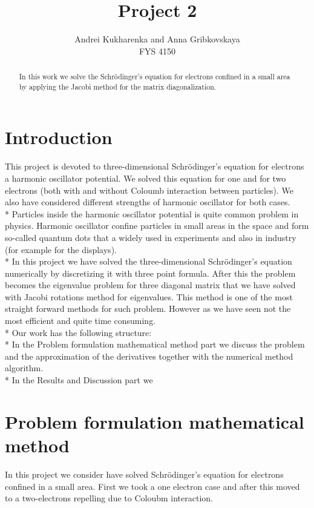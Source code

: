 \documentclass[10pt]{article}
\begin{document}
\setlength\parindent{1pt}
\title{Project 2}
\author{Andrei Kukharenka and Anna Gribkovskaya \\  
FYS 4150 
}

\maketitle
\begin{abstract}
In this work we solve the Schr\"{o}dinger's equation for electrons confined in a small area by applying the Jacobi method for the matrix diagonalization. 
\end{abstract}
\clearpage 


\section{Introduction}
This project is devoted to three-dimensional Schr\"{o}dinger's equation for electrons a harmonic oscillator potential. We solved this equation for one and for two electrons (both with and without Coloumb interaction between particles). We also have considered different strengths of harmonic oscillator for both cases. \\*
Particles inside the harmonic oscillator potential is quite common problem in physics. Harmonic oscillator confine particles in small areas in the space and form so-called quantum dots that a widely used in experiments and also in industry (for example for the displays). \\*
In this project we have solved the three-dimensional Schr\"{o}dinger's equation numerically by discretizing it with three point formula. After this the problem becomes the eigenvalue problem for three diagonal matrix that we have solved with Jacobi rotations method for eigenvalues. This method is one of the most straight forward methods for such problem. However as we have seen not the most efficient and quite time consuming. \\*
Our work has the following structure:\\*
In the Problem formulation mathematical method \label{Part1} part we discuss the problem and the approximation of the derivatives together with the numerical method algorithm. \\*
In the Results and Discussion part we   

\newpage
\section{Problem formulation mathematical method}\label{Part1}
In this project we consider have solved Schr\"{o}dinger's equation for electrons confined in a small area. First we took a one electron case and after this moved to a two-electrons repelling due to Coloubm interaction. 
\end{document}
